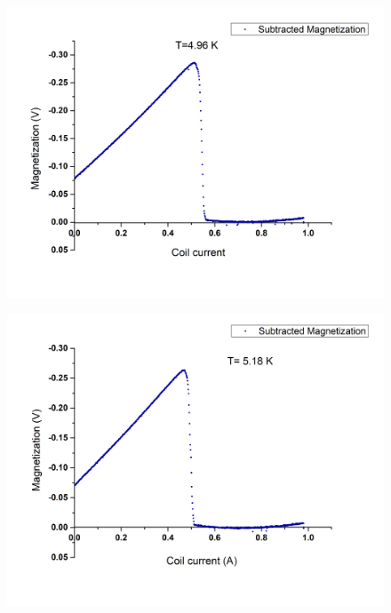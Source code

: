 \documentclass[openany,11pt,a4paper]{report}
\begin{document}
\begin{figure}[H]
\begin{center}
\includegraphics[scale=0.5]{496.jpg} 
\end{center}
\end{figure}


\begin{figure}[H]
\begin{center}
\includegraphics[scale=0.5]{518.jpg} 
\end{center}
\end{figure}
\end{document}
